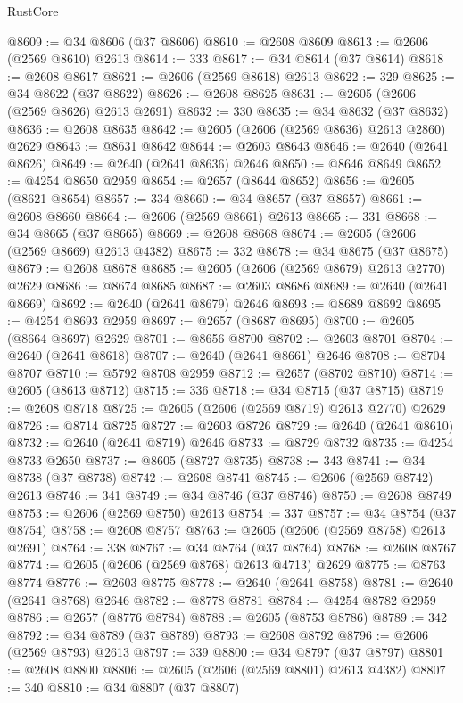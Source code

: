 \begin{lexlean}{RustCore}
\begin{coremodule}
@8609 := @34 @8606 (@37 @8606)
@8610 := @2608 @8609
@8613 := @2606 (@2569 @8610) @2613
@8614 := 333
@8617 := @34 @8614 (@37 @8614)
@8618 := @2608 @8617
@8621 := @2606 (@2569 @8618) @2613
@8622 := 329
@8625 := @34 @8622 (@37 @8622)
@8626 := @2608 @8625
@8631 := @2605 (@2606 (@2569 @8626) @2613 @2691)
@8632 := 330
@8635 := @34 @8632 (@37 @8632)
@8636 := @2608 @8635
@8642 := @2605 (@2606 (@2569 @8636) @2613 @2860) @2629
@8643 := @8631 @8642
@8644 := @2603 @8643
@8646 := @2640 (@2641 @8626)
@8649 := @2640 (@2641 @8636) @2646
@8650 := @8646 @8649
@8652 := @4254 @8650 @2959
@8654 := @2657 (@8644 @8652)
@8656 := @2605 (@8621 @8654)
@8657 := 334
@8660 := @34 @8657 (@37 @8657)
@8661 := @2608 @8660
@8664 := @2606 (@2569 @8661) @2613
@8665 := 331
@8668 := @34 @8665 (@37 @8665)
@8669 := @2608 @8668
@8674 := @2605 (@2606 (@2569 @8669) @2613 @4382)
@8675 := 332
@8678 := @34 @8675 (@37 @8675)
@8679 := @2608 @8678
@8685 := @2605 (@2606 (@2569 @8679) @2613 @2770) @2629
@8686 := @8674 @8685
@8687 := @2603 @8686
@8689 := @2640 (@2641 @8669)
@8692 := @2640 (@2641 @8679) @2646
@8693 := @8689 @8692
@8695 := @4254 @8693 @2959
@8697 := @2657 (@8687 @8695)
@8700 := @2605 (@8664 @8697) @2629
@8701 := @8656 @8700
@8702 := @2603 @8701
@8704 := @2640 (@2641 @8618)
@8707 := @2640 (@2641 @8661) @2646
@8708 := @8704 @8707
@8710 := @5792 @8708 @2959
@8712 := @2657 (@8702 @8710)
@8714 := @2605 (@8613 @8712)
@8715 := 336
@8718 := @34 @8715 (@37 @8715)
@8719 := @2608 @8718
@8725 := @2605 (@2606 (@2569 @8719) @2613 @2770) @2629
@8726 := @8714 @8725
@8727 := @2603 @8726
@8729 := @2640 (@2641 @8610)
@8732 := @2640 (@2641 @8719) @2646
@8733 := @8729 @8732
@8735 := @4254 @8733 @2650
@8737 := @8605 (@8727 @8735)
@8738 := 343
@8741 := @34 @8738 (@37 @8738)
@8742 := @2608 @8741
@8745 := @2606 (@2569 @8742) @2613
@8746 := 341
@8749 := @34 @8746 (@37 @8746)
@8750 := @2608 @8749
@8753 := @2606 (@2569 @8750) @2613
@8754 := 337
@8757 := @34 @8754 (@37 @8754)
@8758 := @2608 @8757
@8763 := @2605 (@2606 (@2569 @8758) @2613 @2691)
@8764 := 338
@8767 := @34 @8764 (@37 @8764)
@8768 := @2608 @8767
@8774 := @2605 (@2606 (@2569 @8768) @2613 @4713) @2629
@8775 := @8763 @8774
@8776 := @2603 @8775
@8778 := @2640 (@2641 @8758)
@8781 := @2640 (@2641 @8768) @2646
@8782 := @8778 @8781
@8784 := @4254 @8782 @2959
@8786 := @2657 (@8776 @8784)
@8788 := @2605 (@8753 @8786)
@8789 := 342
@8792 := @34 @8789 (@37 @8789)
@8793 := @2608 @8792
@8796 := @2606 (@2569 @8793) @2613
@8797 := 339
@8800 := @34 @8797 (@37 @8797)
@8801 := @2608 @8800
@8806 := @2605 (@2606 (@2569 @8801) @2613 @4382)
@8807 := 340
@8810 := @34 @8807 (@37 @8807)

\end{coremodule}
\end{lexlean}
